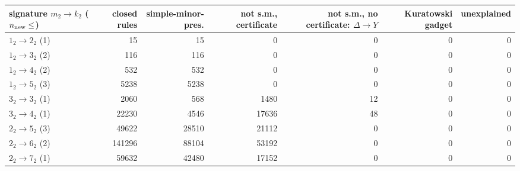 \begin{tabular}{lrrrrrr}
\toprule
signature $m_2\to k_2$ ($n_{\rm new}\le$) & closed rules & simple-minor-pres. & not s.m., certificate & not s.m., no certificate: $\Delta\!\to\!Y$ & Kuratowski gadget & unexplained\\
\midrule
$1_2\to2_2$ (1) & 15 & 15 & 0 & 0 & 0 & 0\\
$1_2\to3_2$ (2) & 116 & 116 & 0 & 0 & 0 & 0\\
$1_2\to4_2$ (2) & 532 & 532 & 0 & 0 & 0 & 0\\
$1_2\to5_2$ (3) & 5238 & 5238 & 0 & 0 & 0 & 0\\
$3_2\to3_2$ (1) & 2060 & 568 & 1480 & 12 & 0 & 0\\
$3_2\to4_2$ (1) & 22230 & 4546 & 17636 & 48 & 0 & 0\\
$2_2\to5_2$ (3) & 49622 & 28510 & 21112 & 0 & 0 & 0\\
$2_2\to6_2$ (2) & 141296 & 88104 & 53192 & 0 & 0 & 0\\
$2_2\to7_2$ (1) & 59632 & 42480 & 17152 & 0 & 0 & 0\\
\bottomrule
\end{tabular}
